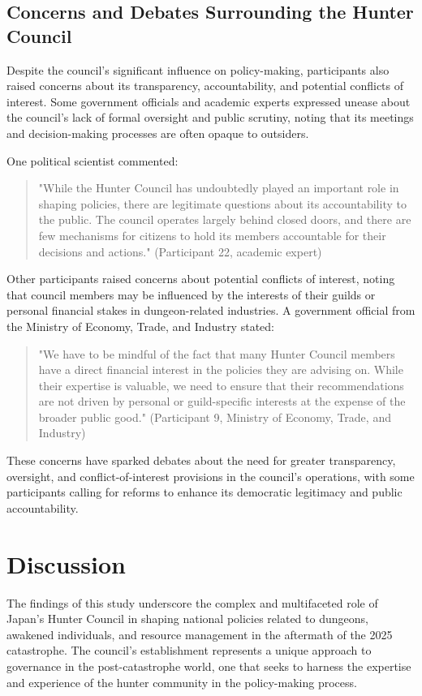 \documentclass[12pt, a4paper]{article}
\begin{document}
\subsection{Concerns and Debates Surrounding the Hunter Council}
Despite the council's significant influence on policy-making, participants also raised concerns about its transparency, accountability, and potential conflicts of interest. Some government officials and academic experts expressed unease about the council's lack of formal oversight and public scrutiny, noting that its meetings and decision-making processes are often opaque to outsiders.

One political scientist commented:

\begin{quote}
    "While the Hunter Council has undoubtedly played an important role in shaping policies, there are legitimate questions about its accountability to the public. The council operates largely behind closed doors, and there are few mechanisms for citizens to hold its members accountable for their decisions and actions." (Participant 22, academic expert)
\end{quote}

Other participants raised concerns about potential conflicts of interest, noting that council members may be influenced by the interests of their guilds or personal financial stakes in dungeon-related industries. A government official from the Ministry of Economy, Trade, and Industry stated:

\begin{quote}
    "We have to be mindful of the fact that many Hunter Council members have a direct financial interest in the policies they are advising on. While their expertise is valuable, we need to ensure that their recommendations are not driven by personal or guild-specific interests at the expense of the broader public good." (Participant 9, Ministry of Economy, Trade, and Industry)
\end{quote}

These concerns have sparked debates about the need for greater transparency, oversight, and conflict-of-interest provisions in the council's operations, with some participants calling for reforms to enhance its democratic legitimacy and public accountability.

\section{Discussion}
The findings of this study underscore the complex and multifaceted role of Japan's Hunter Council in shaping national policies related to dungeons, awakened individuals, and resource management in the aftermath of the 2025 catastrophe. The council's establishment represents a unique approach to governance in the post-catastrophe world, one that seeks to harness the expertise and experience of the hunter community in the policy-making process.
\end{document}
